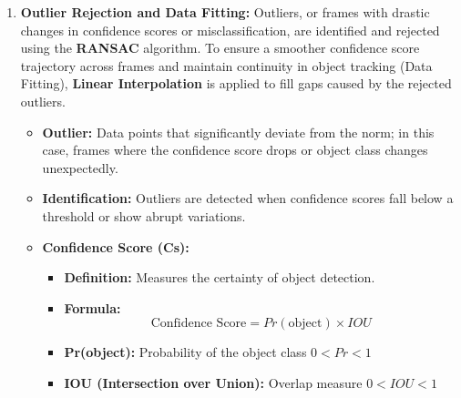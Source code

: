 {\begin{enumerate}
  \begin{itemize}
      \item \textbf{Key Features from YOLOv3:} YOLOv3 uses bounding box dimensions, centroid coordinates, object class, and confidence score for object detection and tracking.
      \item \textbf{Importance of Multiple Features:} Combining features enhances tracking accuracy, especially when some features are unreliable in certain frames (e.g., due to occlusion).
      \item \textbf{Tracking Parameters:} The extracted parameters, combined with the smooth centroid curve of the area, are used to track specific targets throughout the video.
  \end{itemize}
  \item \textbf{Outlier Rejection and Data Fitting:} Outliers, or frames with drastic changes in confidence scores or misclassification, are identified and rejected using the \textbf{RANSAC} algorithm. To ensure a smoother confidence score trajectory across frames and maintain continuity in object tracking (Data Fitting), \textbf{Linear Interpolation} is applied to fill gaps caused by the rejected outliers.
  \begin{itemize}
      \item \textbf{Outlier:} Data points that significantly deviate from the norm; in this case, frames where the confidence score drops or object class changes unexpectedly.
      \item \textbf{Identification:} Outliers are detected when confidence scores fall below a threshold or show abrupt variations.
      \item \textbf{Confidence Score (Cs):}
      \begin{itemize}
          \item \textbf{Definition:} Measures the certainty of object detection.
          \item \textbf{Formula:} 
          \[
          \text{Confidence Score} = Pr(\text{object}) \times IOU
          \]
          \item \textbf{Pr(object):} Probability of the object class \( 0 < Pr < 1 \)
          \item \textbf{IOU (Intersection over Union):} Overlap measure \( 0 < IOU < 1 \)

\end{itemize}
\end{itemize}
\end{enumerate}}
